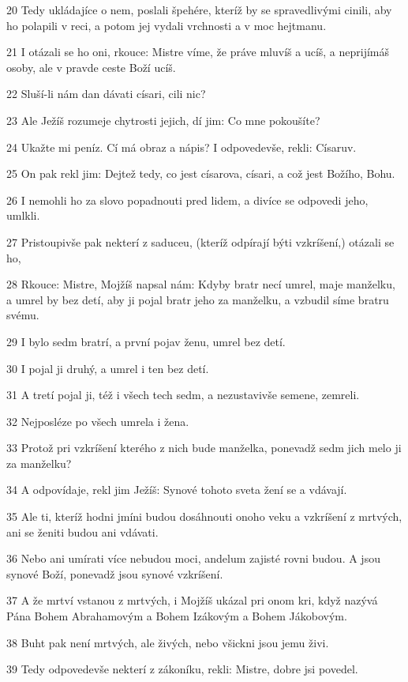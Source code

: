\par 20 Tedy ukládajíce o nem, poslali špehére, kteríž by se spravedlivými cinili, aby ho polapili v reci, a potom jej vydali vrchnosti a v moc hejtmanu.
\par 21 I otázali se ho oni, rkouce: Mistre víme, že práve mluvíš a ucíš, a neprijímáš osoby, ale v pravde ceste Boží ucíš.
\par 22 Sluší-li nám dan dávati císari, cili nic?
\par 23 Ale Ježíš rozumeje chytrosti jejich, dí jim: Co mne pokoušíte?
\par 24 Ukažte mi peníz. Cí má obraz a nápis? I odpovedevše, rekli: Císaruv.
\par 25 On pak rekl jim: Dejtež tedy, co jest císarova, císari, a což jest Božího, Bohu.
\par 26 I nemohli ho za slovo popadnouti pred lidem, a divíce se odpovedi jeho, umlkli.
\par 27 Pristoupivše pak nekterí z saduceu, (kteríž odpírají býti vzkríšení,) otázali se ho,
\par 28 Rkouce: Mistre, Mojžíš napsal nám: Kdyby bratr necí umrel, maje manželku, a umrel by bez detí, aby ji pojal bratr jeho za manželku, a vzbudil síme bratru svému.
\par 29 I bylo sedm bratrí, a první pojav ženu, umrel bez detí.
\par 30 I pojal ji druhý, a umrel i ten bez detí.
\par 31 A tretí pojal ji, též i všech tech sedm, a nezustavivše semene, zemreli.
\par 32 Nejposléze po všech umrela i žena.
\par 33 Protož pri vzkríšení kterého z nich bude manželka, ponevadž sedm jich melo ji za manželku?
\par 34 A odpovídaje, rekl jim Ježíš: Synové tohoto sveta žení se a vdávají.
\par 35 Ale ti, kteríž hodni jmíni budou dosáhnouti onoho veku a vzkríšení z mrtvých, ani se ženiti budou ani vdávati.
\par 36 Nebo ani umírati více nebudou moci, andelum zajisté rovni budou. A jsou synové Boží, ponevadž jsou synové vzkríšení.
\par 37 A že mrtví vstanou z mrtvých, i Mojžíš ukázal pri onom kri, když nazývá Pána Bohem Abrahamovým a Bohem Izákovým a Bohem Jákobovým.
\par 38 Buht pak není mrtvých, ale živých, nebo všickni jsou jemu živi.
\par 39 Tedy odpovedevše nekterí z zákoníku, rekli: Mistre, dobre jsi povedel.
